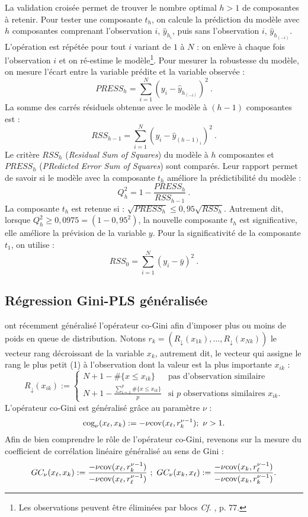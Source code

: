 La validation croisée permet de trouver le nombre optimal $h>1$ de composantes à retenir. Pour tester une composante $t_h$, on calcule la prédiction du modèle avec $h$ composantes comprenant l'observation $i$, $\hat{y}_{h_i}$, puis sans l'observation $i$, $\hat{y}_{h_{(-i)}}$. L'opération est répétée pour tout $i$ variant de $1$ à $N$ : on enlève à chaque fois l'observation $i$ et on ré-estime le modèle\footnote{Les observations peuvent être éliminées par blocs \emph{Cf.} \citet{tenenhaus1998regressionPLS}, p. 77.}. Pour mesurer la robustesse du modèle, on mesure l'écart entre la variable prédite et la variable observée :
\[
PRESS_h = \sum\limits_{i=1}^N\left(y_i - \hat{y}_{h_{(-i)}}\right)^2 \ .
\]
La somme des carrés résiduels obtenue avec le modèle à $(h-1)$ composantes est : 
\[
RSS_{h-1} = \sum\limits_{i=1}^N \left(y_i - \hat{y}_{(h-1)_i}\right)^2 \ .
\]
Le critère $RSS_h$ (\textit{Residual Sum of Squares}) du modèle à $h$ composantes et $PRESS_h$ (\textit{PRedicted Error Sum of Squares}) sont comparés. Leur rapport permet de savoir si le modèle avec la composante $t_h$ améliore la prédictibilité du modèle :
\[
Q^2_h =1 - \frac{PRESS_h}{RSS_{h-1}} \ .
\]
La composante $t_h$ est retenue si : $\sqrt{PRESS_h} \leq 0,95 \sqrt{RSS_h}$. Autrement dit, lorsque $Q^2_h \geq 0,0975 = (1 - 0,95^2)$, la nouvelle composante $t_h$ est significative, elle améliore la prévision de la variable $y$. Pour la significativité de la composante $t_1$, on utilise :
\[
RSS_0 = \sum^{N}_{i = 1} \left(y_i - \bar{y}\right)^2 \ .
\]


\subsection{Régression Gini-PLS généralisée} 

\citet{Schechtman03} ont récemment généralisé l'opérateur co-Gini afin d'imposer plus ou moins de poids en queue de distribution. Notons $r_{k}=(R_\downarrow(x_{1k}),\ldots, R_\downarrow(x_{Nk}))$ le vecteur rang décroissant de la variable $x_k$, autrement dit, le vecteur qui assigne le rang le plus petit (1) à l'observation dont la valeur est la plus importante $x_{ik}$ :
\[
R_\downarrow(x_{ik}) :=
\left\{ \begin{array}{ll}
N+1- \#\{x \leq x_{ik} \} & \text{pas d'observation similaire} \\
N+1-\frac{\sum_{i=1}^p \#\{ x \leq x_{ik} \}}{p} & \text{si $p$ observations similaires $x_{ik}$.}
\end{array}
\right.
\]
L'opérateur co-Gini est généralisé grâce au paramètre $\nu$ :
\begin{equation}\label{cogg}
\text{cog}_\nu(x_\ell,x_k) := -\nu \text{cov}(x_\ell,r_{k}^{\nu-1}) ; \ \nu > 1.
\end{equation}
Afin de bien comprendre le rôle de l'opérateur co-Gini, revenons sur la mesure du coefficient de corrélation linéaire généralisé au sens de Gini :
\[
GC_\nu(x_\ell,x_k) := \frac{-\nu \text{cov}(x_\ell,r_{k}^{\nu-1})}{-\nu \text{cov}(x_\ell,r_{\ell}^{\nu-1})} \ ; \ GC_\nu(x_k,x_\ell) := \frac{-\nu \text{cov}(x_k,r_{\ell}^{\nu-1})}{-\nu \text{cov}(x_k,r_{k}^{\nu-1})}.
\]

